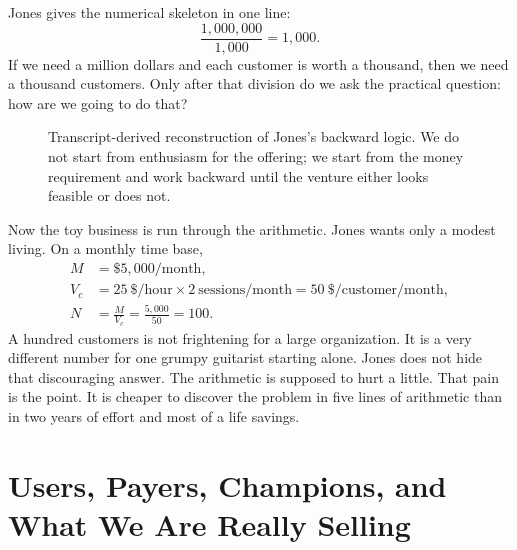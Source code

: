 Jones gives the numerical skeleton in one line:
\begin{equation}
\frac{1{,}000{,}000}{1{,}000}=1{,}000.
\end{equation}
If we need a million dollars and each customer is worth a thousand, then we need a thousand customers. Only after that division do we ask the practical question: how are we going to do that?

\begin{figure}
\centering
{}
\caption{Transcript-derived reconstruction of Jones's backward logic. We do not start from enthusiasm for the offering; we start from the money requirement and work backward until the venture either looks feasible or does not.}
\end{figure}

Now the toy business is run through the arithmetic. Jones wants only a modest living. On a monthly time base,
\begin{align}
M &= \$5{,}000/\text{month},\\
V_c &= 25\ \$/\text{hour}\times 2\ \text{sessions/month}
     = 50\ \$/\text{customer/month},\\
N &= \frac{M}{V_c}
   = \frac{5{,}000}{50}
   = 100.
\end{align}
A hundred customers is not frightening for a large organization. It is a very different number for one grumpy guitarist starting alone. Jones does not hide that discouraging answer. The arithmetic is supposed to hurt a little. That pain is the point. It is cheaper to discover the problem in five lines of arithmetic than in two years of effort and most of a life savings.

\section{Users, Payers, Champions, and What We Are Really Selling}

